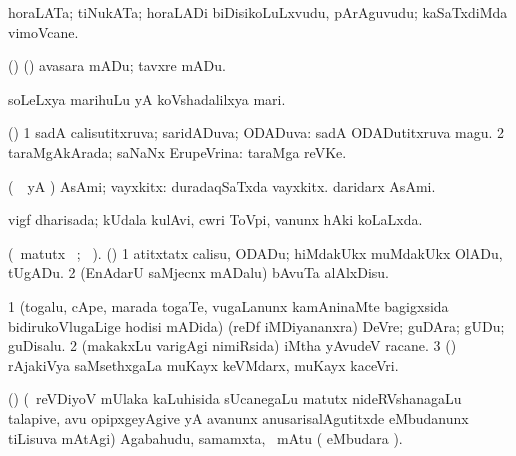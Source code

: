 \bentry
{}
\pron{}
\gl{\nA}
\bmng
horaLATa; tiNukATa; horaLADi biDisikoLuLxvudu, pArAguvudu; kaSaTxdiMda vimoVcane. 
\emng

\noindent 
\gl{\pagu}
\bmng
{} (\ame) (\ashi) avasara mADu; tavxre mADu. 
\emng
\eentry

\bentry 
{}
\gl{\nA}
\bmng
soLeLxya marihuLu yA koVshadalilxya mari. 
\emng
\eentry

\bentry
{} 
\gl{\gu}
\bmng
(\AmA) 
\bnum
\num{1} sadA calisutitxruva; saridADuva; ODADuva:  sadA ODADutitxruva magu. 
\num{2} taraMgAkArada; saNaNx ErupeVrina:  taraMga reVKe. 
\enum
\emng
\eentry

\bentry
{}
\gl{\nA}
\bmng
(\pArxparx\ \hA\ yA \pArxM) AsAmi; vayxkitx:  duradaqSaTxda vayxkitx.  daridarx AsAmi. 
\emng
\eentry

\bentry
{}
\gl{\gu}
\bmng
vigf dharisada; kUdala kulAvi, cwri ToVpi, \mo vanunx hAki koLaLxda. 
\emng
\eentry

\bentry
{}
\gl{\kirx} 
 (\BU\ matutx \BUkaq\ ; \vakaq\ ). 
\bmng
(\AmA) 
\bnum
\num{1} atitxtatx calisu, ODADu; hiMdakUkx muMdakUkx OlADu, tUgADu. 
\num{2} (EnAdarU saMjecnx mADalu) bAvuTa alAlxDisu. 
\enum
\emng
\eentry

\bentry
{}
\gl{\nA}
\bmng
\bnum
\num{1} (togalu, cApe, marada togaTe, \mo vugaLanunx kamAninaMte bagigxsida bidirukoVlugaLige hodisi mADida) (reDf iMDiyananxra) DeVre; guDAra; gUDu; guDisalu. 
\num{2} (makakxLu \mo varigAgi nimiRsida) iMtha yAvudeV racane. 
\num{3} (\ame) rAjakiVya saMsethxgaLa muKayx keVMdarx, muKayx kaceVri. 
\enum
\emng
\eentry

\bentry
{}
\gl{\BAavayx}
\bmng
(\AmA) (\kanmu\ reVDiyoV mUlaka kaLuhisida sUcanegaLu matutx nideRVshanagaLu talapive, avu opipxgeyAgive yA avanunx anusarisalAgutitxde eMbudanunx tiLisuva mAtAgi) Agabahudu, samamxta, \mo\ mAtu ( eMbudara \saMkiSx). 
\emng
\eentry

